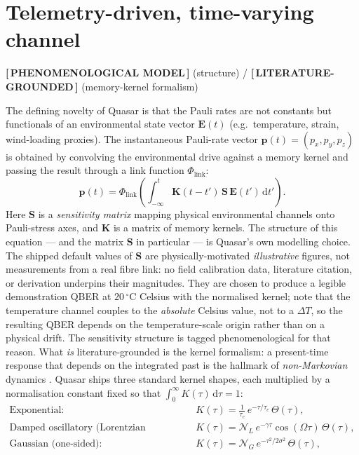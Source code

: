 \documentclass[11pt]{article}
\newcommand{\statusVerified}{\textbf{\color{verified}[\,LITERATURE-GROUNDED\,]}}
\newcommand{\statusPhenom}{\textbf{\color{phenom}[\,PHENOMENOLOGICAL MODEL\,]}}
\newcommand{\dd}{\mathrm{d}}
\begin{document}
\section{Telemetry-driven, time-varying channel}
\statusPhenom{} (structure) / \statusVerified{} (memory-kernel formalism)

The defining novelty of Quasar is that the Pauli rates are not constants but functionals of
an environmental state vector $\bm{E}(t)$ (e.g.\ temperature, strain, wind-loading proxies).
The instantaneous Pauli-rate vector $\bm{p}(t)=(p_x,p_y,p_z)$ is obtained by convolving the
environmental drive against a memory kernel and passing the result through a link function
$\Phi_{\mathrm{link}}$:
\begin{equation}
\boxed{\;\bm{p}(t)=\Phi_{\mathrm{link}}\!\left(\int_{-\infty}^{t}
\mathbf{K}(t-t')\,\mathbf{S}\,\bm{E}(t')\,\dd t'\right).\;}
\end{equation}
Here $\mathbf{S}$ is a \emph{sensitivity matrix} mapping physical environmental channels onto
Pauli-stress axes, and $\mathbf{K}$ is a matrix of memory kernels. The structure of this
equation --- and the matrix $\mathbf{S}$ in particular --- is Quasar's own modelling choice.
The shipped default values of $\mathbf{S}$ are physically-motivated \emph{illustrative} figures,
not measurements from a real fibre link: no field calibration data, literature citation, or
derivation underpins their magnitudes.  They are chosen to produce a legible demonstration
QBER at $20\,^\circ\mathrm{C}$ Celsius with the normalised kernel; note that the temperature
channel couples to the \emph{absolute} Celsius value, not to a $\Delta T$, so the resulting
QBER depends on the temperature-scale origin rather than on a physical drift.  The sensitivity
structure is tagged phenomenological for that reason.
What \emph{is} literature-grounded is the kernel formalism: a present-time response that depends
on the integrated past is the hallmark of \emph{non-Markovian} dynamics
\cite{breuerbook,rhp2014}. Quasar ships three standard kernel shapes, each multiplied by a
normalisation constant fixed so that $\int_0^{\infty}K(\tau)\,\dd\tau=1$:
\begin{align}
\text{Exponential:}\quad & K(\tau)=\frac{1}{\tau_c}\,e^{-\tau/\tau_c}\,\Theta(\tau),\\
\text{Damped oscillatory (Lorentzian spectrum):}\quad & K(\tau)=\mathcal{N}_{\!L}\,e^{-\gamma\tau}\cos(\Omega\tau)\,\Theta(\tau),\\
\text{Gaussian (one-sided):}\quad & K(\tau)=\mathcal{N}_{\!G}\,e^{-\tau^2/2\sigma^2}\,\Theta(\tau),
\end{align}
\end{document}

